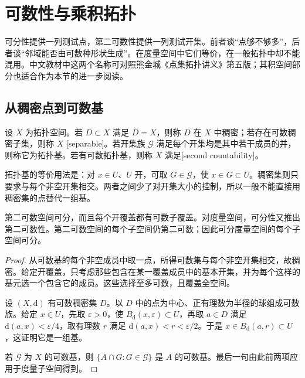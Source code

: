 \section{可数性与乘积拓扑}
\label{b1:sec:A103}

可分性提供一列测试点，第二可数性提供一列测试开集。前者谈“点够不够多”，后者谈“邻域能否由可数种形状生成”。在度量空间中它们等价，在一般拓扑中却不能混用。中文教材中这两个名称可对照熊金城《点集拓扑讲义》第五版\cite[第5章]{Xiong2020Topology}；其积空间部分也适合作为本节的进一步阅读。

\subsection{从稠密点到可数基}
\label{b1:subsec:A10301}

\begin{definition}\label{b1:def:app-countability}
设 \(X\) 为拓扑空间。若 \(D\subset X\) 满足 \(\overline D=X\)，则称 \(D\) 在 \(X\) 中稠密；若存在可数稠密子集，则称 \(X\) [separable]。若开集族 \(\mathcal G\) 满足每个开集均是其中若干成员的并，则称它为拓扑基。若有可数拓扑基，则称 \(X\) 满足[second countability]。
\end{definition}

拓扑基的等价用法是：对 \(x\in U\)、\(U\) 开，可取 \(G\in\mathcal G\)，使 \(x\in G\subset U\)。稠密集则只要求与每个非空开集相交。两者之间少了对开集大小的控制，所以一般不能直接用稠密集的点替代一组基。

\begin{theorem}\label{b1:thm:app-separable-base}
第二可数空间可分，而且每个开覆盖都有可数子覆盖。对度量空间，可分性又推出第二可数性。第二可数空间的每个子空间仍第二可数；因此可分度量空间的每个子空间可分。
\end{theorem}
\begin{proof}
从可数基的每个非空成员中取一点，所得可数集与每个非空开集相交，故稠密。给定开覆盖，只考虑那些包含在某一覆盖成员中的基本开集，并为每个这样的基元选一个包含它的成员。这些选择至多可数，且覆盖全空间。

设 \((X,\mathrm{d})\) 有可数稠密集 \(D\)。以 \(D\) 中的点为中心、正有理数为半径的球组成可数族。给定 \(x\in U\)，先取 \(\varepsilon>0\)，使 \(B_{\mathrm{d}}(x,\varepsilon)\subset U\)，再取 \(a\in D\) 满足 \(\mathrm{d}(a,x)<\varepsilon/4\)，取有理数 \(r\) 满足 \(\mathrm{d}(a,x)<r<\varepsilon/2\)。于是 \(x\in B_{\mathrm{d}}(a,r)\subset U\)，这证明它是一组基。

若 \(\mathcal G\) 为 \(X\) 的可数基，则 \(\{A\cap G:G\in\mathcal G\}\) 是 \(A\) 的可数基。最后一句由此前两项应用于度量子空间得到。
\end{proof}

